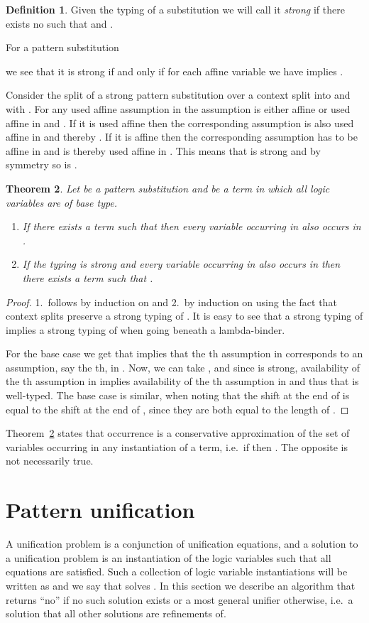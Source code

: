 \documentclass{eptcs}
\newtheorem{thm}{Theorem}[section]
\theoremstyle{definition}
\newtheorem{defin}[thm]{Definition}
\begin{document}
\begin{defin}
Given the typing of a substitution  we will
call it \emph{strong} if there exists no  such
that  and .
\end{defin}
For a pattern substitution

we see that it is strong if and only if
for each affine variable  we have  implies
.

Consider the split of a strong pattern substitution
 over a context split
 into  and
 with .
For any used affine assumption in  the assumption is either
affine or used affine in  and .  If it is used affine then the
corresponding assumption is also used affine in  and thereby
.  If it is affine then the corresponding assumption has to be
affine in  and is thereby used affine in .  This
means that  is strong and by symmetry so is
.

\begin{thm}\label{thm:occurrence}
Let  be a pattern substitution and
 be a term in which all logic variables
are of base type.
\begin{enumerate}
\item
If there exists a term  such that 
then every variable occurring in  also occurs in .
\item
If the typing  is strong and every variable
occurring in  also occurs in  then there exists a term
 such that .
\end{enumerate}
\end{thm}
\begin{proof}
1.\ follows by induction on  and 2.\ by induction on   using the
fact that context splits preserve a strong typing of .  It is easy to see
that a strong typing of  implies a strong typing of
 when going beneath a lambda-binder.

For the base case
 we get that  implies that the th assumption in
 corresponds to an assumption, say the th, in .
Now, we can take , and since  is strong, availability of the
th assumption in  implies availability of the th
assumption in  and thus that  is well-typed.
The base case  is similar, when noting that the shift at the end
of  is equal to the shift at the end of , since they
are both equal to the length of .
\end{proof}

Theorem~\ref{thm:occurrence} states that occurrence is a
conservative approximation of the set of
variables occurring in any instantiation of a term,
i.e.\ if  then .  The opposite is
not necessarily true.


\section{Pattern unification}
A unification problem  is a conjunction of unification
equations, and a solution to a unification problem is an instantiation
of the logic variables such that all equations are satisfied.  Such a
collection of logic variable instantiations will be written as 
and we say that  solves .  In this section we describe an
algorithm that returns ``no'' if no such solution exists or a
most general unifier otherwise, i.e.\ a solution that all other solutions are
refinements of.
\end{document}
